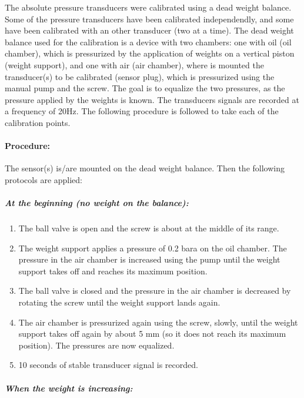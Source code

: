 The absolute pressure transducers were calibrated using a dead weight
balance. Some of the pressure transducers have been calibrated
independendly, and some have been calibrated with an other transducer
(two at a time). The dead weight balance used for the calibration is a
device with two chambers: one with oil (oil chamber), which is
pressurized by the application of weights on a vertical piston (weight
support), and one with air (air chamber), where is mounted the
transducer(s) to be calibrated (sensor plug), which is pressurized
using the manual pump and the screw. The goal is to equalize the two
pressures, as the pressure applied by the weights is known. The
transducers signals are recorded at a frequency of 20Hz. The following
procedure is followed to take each of the calibration points.

\paragraph{Procedure:}

The sensor(s) is/are mounted on the dead weight balance. Then the
following protocols are applied:

\subparagraph{At the beginning (no weight on the balance):}

\begin{enumerate}
\item The ball valve is open and the screw is about at the
  middle of its range.
\item The weight support applies a pressure of 0.2 bara on the oil
  chamber. The pressure in the air chamber is increased using
  the pump until the weight support takes off and reaches its
  maximum position.
\item The ball valve is closed and the pressure in the air chamber
  is decreased by rotating the screw until the weight support
  lands again.
\item The air chamber is pressurized again using the screw,
  slowly, until the weight support takes off again by about 5 mm
  (so it does not reach its maximum position). The pressures are now
  equalized.
\item 10 seconds of stable transducer signal is recorded.
\end{enumerate}

\subparagraph{When the weight is increasing:}

